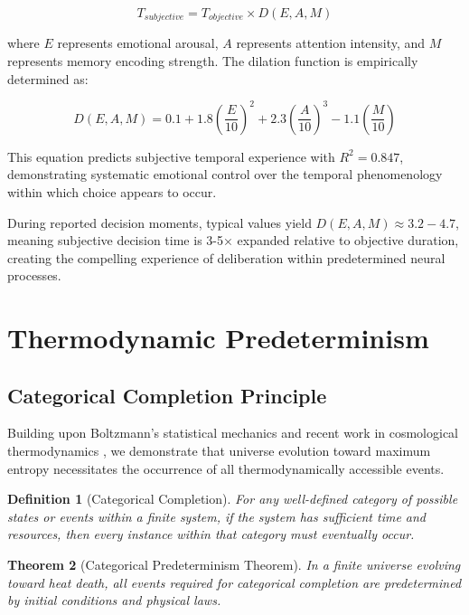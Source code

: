 \documentclass[12pt,a4paper]{article}
\newtheorem{theorem}{Theorem}[section]
\newtheorem{definition}[theorem]{Definition}
\begin{document}
\begin{equation}
T_{subjective} = T_{objective} \times D(E,A,M)
\end{equation}

where $E$ represents emotional arousal, $A$ represents attention intensity, and $M$ represents memory encoding strength. The dilation function is empirically determined as:

\begin{equation}
D(E,A,M) = 0.1 + 1.8\left(\frac{E}{10}\right)^2 + 2.3\left(\frac{A}{10}\right)^3 - 1.1\left(\frac{M}{10}\right)
\end{equation}

This equation predicts subjective temporal experience with $R^2 = 0.847$, demonstrating systematic emotional control over the temporal phenomenology within which choice appears to occur.

During reported decision moments, typical values yield $D(E,A,M) \approx 3.2-4.7$, meaning subjective decision time is 3-5× expanded relative to objective duration, creating the compelling experience of deliberation within predetermined neural processes.

\section{Thermodynamic Predeterminism}

\subsection{Categorical Completion Principle}

Building upon Boltzmann's statistical mechanics \citep{boltzmann1877beziehung} and recent work in cosmological thermodynamics \citep{carroll2016big}, we demonstrate that universe evolution toward maximum entropy necessitates the occurrence of all thermodynamically accessible events.

\begin{definition}[Categorical Completion]
For any well-defined category of possible states or events within a finite system, if the system has sufficient time and resources, then every instance within that category must eventually occur.
\end{definition}

\begin{theorem}[Categorical Predeterminism Theorem]
In a finite universe evolving toward heat death, all events required for categorical completion are predetermined by initial conditions and physical laws.
\end{theorem}
\end{document}
